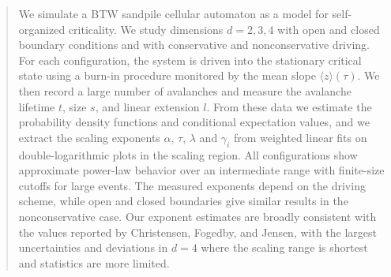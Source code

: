 \begin{abstract}
We simulate a BTW sandpile cellular automaton as a model for self-organized
criticality. We study dimensions $d=2,3,4$ with open and closed boundary
conditions and with conservative and nonconservative driving. For each
configuration, the system is driven into the stationary critical state using
a burn-in procedure monitored by the mean slope $\langle z\rangle(\tau)$.
We then record a large number of avalanches and measure the avalanche
lifetime $t$, size $s$, and linear extension $l$. From these data we estimate
the probability density functions and conditional expectation values, and we
extract the scaling exponents $\alpha$, $\tau$, $\lambda$ and $\gamma_i$ from
weighted linear fits on double-logarithmic plots in the scaling region.
All configurations show approximate power-law behavior over an intermediate
range with finite-size cutoffs for large events. The measured exponents
depend on the driving scheme, while open and closed boundaries give similar
results in the nonconservative case. Our exponent estimates are broadly
consistent with the values reported by Christensen, Fogedby, and Jensen,
with the largest uncertainties and deviations in $d=4$ where the scaling
range is shortest and statistics are more limited.
\end{abstract}